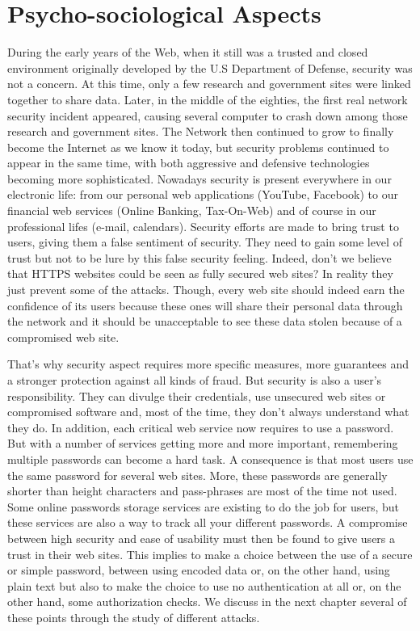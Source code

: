 
\section{Psycho-sociological Aspects}

During the early years of the Web, when it still was a trusted and closed
environment originally developed by the U.S Department of Defense, security was
not a concern. At this time, only a few research and government sites were
linked together to share data. Later, in the middle of the eighties, the first
real network security incident appeared, causing several computer to crash down
among those research and government sites. The Network then continued to grow to
finally become the Internet as we know it today, but security problems continued
to appear in the same time, with both aggressive and defensive technologies
becoming more sophisticated. Nowadays security is present everywhere in our
electronic life: from our personal web applications (YouTube, Facebook) to our
financial web services (Online Banking, Tax-On-Web) and of course in our
professional lifes (e-mail, calendars). Security efforts are made to bring trust
to users, giving them a false sentiment of security. They need to gain some
level of trust but not to be lure by this false security feeling. Indeed, don't
we believe that HTTPS websites could be seen as fully secured web sites? In
reality they just prevent some of the attacks. Though, every web site should
indeed earn the confidence of its users because these ones will share their
personal data through the network and it should be unacceptable to see these
data stolen because of a compromised web site.

That's why security aspect requires more specific measures, more guarantees and
a stronger protection against all kinds of fraud. But security is also a user's
responsibility. They can divulge their credentials, use unsecured web sites or
compromised software and, most of the time, they don't always understand what
they do. In addition, each critical web service now requires to use a password.
But with a number of services getting more and more important, remembering
multiple passwords can become a hard task. A consequence is that most users use
the same password for several web sites. More, these passwords are generally
shorter than height characters and pass-phrases are most of the time not used.
Some online passwords storage services are existing to do the job for users, but
these services are also a way to track all your different passwords. A
compromise between high security and ease of usability must then be found to
give users a trust in their web sites. This implies to make a choice between the
use of a secure or simple password, between using encoded data or, on the other
hand, using plain text but also to make the choice to use no authentication at
all or, on the other hand, some authorization checks. We discuss in the next
chapter several of these points through the study of different attacks.

